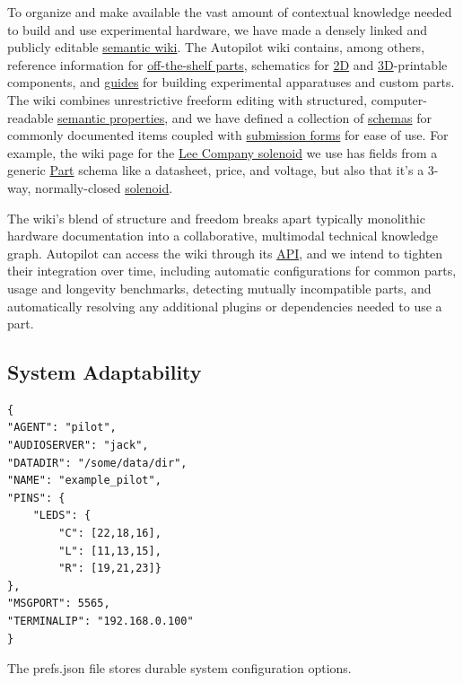 To organize and make available the vast amount of contextual knowledge needed to build and use experimental hardware, we have made a densely linked and publicly editable \href{https://wiki.auto-pi-lot.com/index.php/Autopilot_Wiki}{semantic wiki}. The Autopilot wiki contains, among others, reference information for \href{https://wiki.auto-pi-lot.com/index.php/Parts}{off-the-shelf parts}, schematics for \href{https://wiki.auto-pi-lot.com/index.php/2D_CAD}{2D} and \href{https://wiki.auto-pi-lot.com/index.php/3D_CAD}{3D}-printable components, and \href{https://wiki.auto-pi-lot.com/index.php/Guides}{guides} for building experimental apparatuses and custom parts. The wiki combines unrestrictive freeform editing with structured, computer-readable \href{https://www.semantic-mediawiki.org/wiki/Semantic_MediaWiki}{semantic properties}, and we have defined a collection of \href{https://wiki.auto-pi-lot.com/index.php/Special:CategoryTree?target=Hardware&mode=categories&namespaces=&title=Special%3ACategoryTree}{schemas} for commonly documented items coupled with \href{https://wiki.auto-pi-lot.com/index.php/Special:Forms}{submission forms} for ease of use. For example, the wiki page for the \href{https://wiki.auto-pi-lot.com/index.php/Lee_LHDA0531115H}{Lee Company solenoid} we use has fields from a generic \href{https://wiki.auto-pi-lot.com/index.php/Category:Part}{Part} schema like a datasheet, price, and voltage, but also that it's a 3-way, normally-closed \href{https://wiki.auto-pi-lot.com/index.php/Category:Solenoid}{solenoid}. 

The wiki's blend of structure and freedom breaks apart typically monolithic hardware documentation into a collaborative, multimodal technical knowledge graph. Autopilot can access the wiki through its \href{https://docs.auto-pi-lot.com/en/latest/guide/plugins.html\#the-wiki-api}{API}, and we intend to tighten their integration over time, including automatic configurations for common parts, usage and longevity benchmarks, detecting mutually incompatible parts, and automatically resolving any additional plugins or dependencies needed to use a part.



\clearpage

\subsection{System Adaptability}

\begin{marginfigure}[0.4cm]
\begin{verbatim}
{
"AGENT": "pilot",
"AUDIOSERVER": "jack",
"DATADIR": "/some/data/dir",
"NAME": "example_pilot",
"PINS": {
    "LEDS": {
        "C": [22,18,16],
        "L": [11,13,15],
        "R": [19,21,23]}
},
"MSGPORT": 5565,
"TERMINALIP": "192.168.0.100"
}
\end{verbatim}
\caption{The prefs.json file stores durable system configuration options.}
\label{fig:prefs}
\end{marginfigure}%

